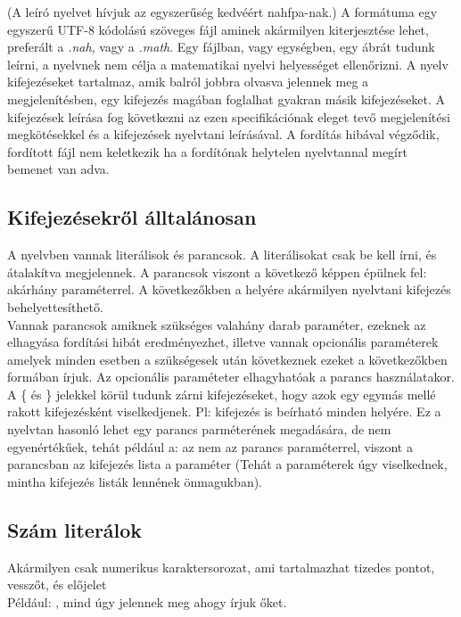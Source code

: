 \documentclass[../spec.tex]{subfiles}
\begin{document}
    (A leíró nyelvet hívjuk az egyszerűség kedvéért nahfpa-nak.)
    A formátuma egy egyszerű UTF-8 kódolású szöveges fájl aminek akármilyen kiterjesztése lehet, preferált a \textit{.nah}, vagy a \textit{.math}.
    Egy fájlban, vagy egységben, egy ábrát tudunk leírni, a nyelvnek nem célja a matematikai nyelvi helyességet ellenőrizni.
    A nyelv kifejezéseket tartalmaz, amik balról jobbra olvasva jelennek meg a megjelenítésben, egy kifejezés magában foglalhat gyakran másik kifejezéseket.
    A kifejezések leírása fog következni az ezen specifikációnak eleget tevő megjelenítési megkötésekkel és a kifejezések nyelvtani leírásával.
    A fordítás hibával végződik, fordított fájl nem keletkezik ha a fordítónak helytelen nyelvtannal megírt bemenet van adva.

    \subsection{Kifejezésekről álltalánosan}\label{subsec:kifejezésekből-álltalánosan}
    A nyelvben vannak literálisok és parancsok.
    A literálisokat csak be kell írni, és átalakítva megjelennek.
    A parancsok viszont a következő képpen épülnek fel:  akárhány paraméterrel.
    A következőkben a \lang{[kif]} helyére akármilyen nyelvtani kifejezés behelyettesíthető.\\
    Vannak parancsok amiknek szükséges valahány darab paraméter, ezeknek az elhagyása fordítási hibát eredményezhet, illetve vannak opcionális paraméterek amelyek minden esetben
    a szükségesek után következnek ezeket a következőkben \lang{[?paraméter]} formában írjuk.
    Az opcionális paraméteter elhagyhatóak a parancs használatakor.\\
    A \{ és \} jelekkel körül tudunk zárni kifejezéseket, hogy azok egy egymás mellé rakott kifejezésként viselkedjenek.
    Pl:  kifejezés is beírható minden \lang{[kif]} helyére.
    Ez a nyelvtan hasonló lehet egy parancs parméterének megadására, de nem egyenértékűek, tehát például a:  az nem az  parancs  paraméterrel,
    viszont a  parancsban az  kifejezés lista a paraméter (Tehát a paraméterek úgy viselkednek, mintha kifejezés listák lennének önmagukban).

    \subsection{Szám literálok}\label{subsec:szám-literálok}
    Akármilyen csak numerikus karaktersorozat, ami tartalmazhat tizedes pontot, vesszőt, és előjelet\\
    Például: ,  mind úgy jelennek meg ahogy írjuk őket.
\end{document}

